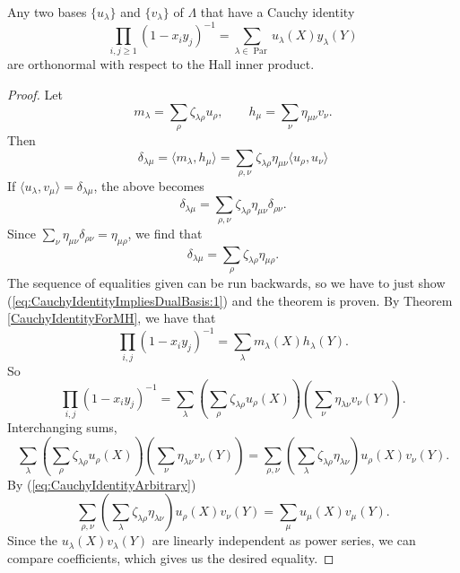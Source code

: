 \documentclass{article}
\DeclareMathOperator{\Par}{Par}
\begin{document}
\begin{theorem}\label{thm:CauchyIdentityImpliesOrthonormal}
    Any two bases $\{u_\lambda\}$ and $\{v_\lambda\}$ of $\Lambda$ that have a Cauchy identity
    \begin{equation}\label{eq:CauchyIdentityArbitrary}
        \prod_{i,j \geq 1}(1 - x_iy_j)^{-1} = \sum_{\lambda\in\Par} u_\lambda(X) y_\lambda(Y)
    \end{equation}
    are orthonormal with respect to the Hall inner product.
\end{theorem}

\begin{proof}
    Let
    \[
        m_\lambda = \sum_\rho \zeta_{\lambda\rho} u_\rho, \qquad h_\mu = \sum_\nu \eta_{\mu\nu} v_\nu.
    \]
    Then
    \[
        \delta_{\lambda\mu} = \langle m_\lambda, h_\mu \rangle = \sum_{\rho,\nu}\zeta_{\lambda\rho} \eta_{\mu\nu} \langle u_\rho, u_\nu \rangle
    \]
    If $\langle u_\lambda, v_\mu \rangle = \delta_{\lambda\mu}$, the above becomes
    \[
        \delta_{\lambda\mu} =  \sum_{\rho,\nu}\zeta_{\lambda\rho} \eta_{\mu\nu} \delta_{\rho\nu}.
    \]
    Since $\sum_\nu \eta_{\mu\nu}\delta_{\rho\nu} = \eta_{\mu\rho}$, we find that
    \begin{equation}\label{eq:CauchyIdentityImpliesDualBasis:1}
        \delta_{\lambda\mu} =  \sum_\rho\zeta_{\lambda\rho} \eta_{\mu\rho}.
    \end{equation}
    The sequence of equalities given can be run backwards, so we have to just show (\ref{eq:CauchyIdentityImpliesDualBasis:1}) and the theorem is proven.
    By Theorem \ref{CauchyIdentityForMH}, we have that
    \[
        \prod_{i,j}(1-x_iy_j)^{-1} = \sum_\lambda m_\lambda(X) h_\lambda(Y).
    \]
    So 
    \[
        \prod_{i,j}(1-x_iy_j)^{-1} = \sum_\lambda \left(\sum_\rho \zeta_{\lambda\rho} u_\rho(X)\right)\left(\sum_\nu \eta_{\lambda\nu}v_\nu(Y)\right).
    \]
    Interchanging sums,
    \[
        \sum_\lambda \left(\sum_\rho \zeta_{\lambda\rho} u_\rho(X)\right)\left(\sum_\nu \eta_{\lambda\nu}v_\nu(Y)\right) = \sum_{\rho,\nu} \left(\sum_\lambda \zeta_{\lambda\rho} \eta_{\lambda\nu}\right) u_\rho(X) v_\nu(Y).
    \]
    By (\ref{eq:CauchyIdentityArbitrary})
    \[
        \sum_{\rho,\nu} \left(\sum_\lambda \zeta_{\lambda\rho} \eta_{\lambda\nu}\right) u_\rho(X) v_\nu(Y) = \sum_\mu u_\mu(X) v_\mu(Y).
    \]
    Since the $u_\lambda(X)v_\lambda(Y)$ are linearly independent as power series, we can compare coefficients, which gives us the desired equality.
\end{proof}
\end{document}
